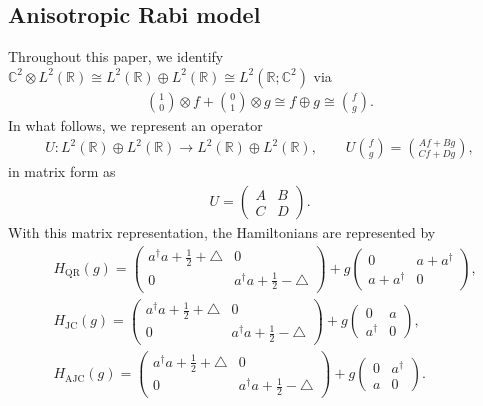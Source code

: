 \documentclass[12pt,dvipdfmx]{article}
\newcommand{\RR}{\mathbb{R}}
\newcommand{\CC}{\mathbb{C}}
\begin{document}
\subsection{Anisotropic Rabi model}\label{sec:anisotropic}
%
%
Throughout this paper, we identify $\CC^2 \otimes L^2(\RR) \cong L^2(\RR) \oplus L^2(\RR) \cong L^2(\RR; \CC^2)$ via 
\begin{align*}
    \binom{1}{0} \otimes f + \binom{0}{1} \otimes g 
    \cong 
    f \oplus g \cong \binom{f}{g}.
\end{align*} 
In what follows, we represent an operator
\begin{align*}
U:L^2(\mathbb{R})\oplus L^2(\mathbb{R})
 \longrightarrow L^2(\mathbb{R})\oplus L^2(\mathbb{R}),
\qquad
U\binom{f}{g}
=
\binom{Af+Bg}{Cf+Dg},
\end{align*}
in matrix form as
\begin{align*}
U=
\begin{pmatrix}
A & B\\
C & D
\end{pmatrix}.
\end{align*}
With this matrix representation, the Hamiltonians are represented by
\begin{align*}
    &H_\mathrm{QR}(g) 
    = \begin{pmatrix} 
        a^\dagger a + \frac12 + \triangle & 0 \\
        0 & a^\dagger a + \frac12 - \triangle
    \end{pmatrix}
    + g \begin{pmatrix}
        0  & a + a^\dagger \\ 
        a + a^\dagger & 0
    \end{pmatrix}, \\
    &H_\mathrm{JC} (g) 
    = \begin{pmatrix}
        a^\dagger a + \frac12 + \triangle & 0 \\
        0 & a^\dagger a + \frac12 - \triangle
    \end{pmatrix}
    + g \begin{pmatrix} 
        0 & a \\ 
        a^\dagger & 0 
    \end{pmatrix}, \\
    &H_\mathrm{AJC}(g) 
    = \begin{pmatrix}
        a^\dagger a + \frac12 + \triangle & 0 \\
        0 & a^\dagger a + \frac12 - \triangle
    \end{pmatrix}
    + g \begin{pmatrix} 
        0 & a^\dagger \\ 
        a & 0 
    \end{pmatrix}.
\end{align*}
\end{document}
